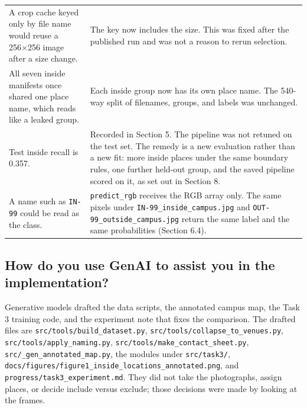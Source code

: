 \documentclass[11pt,a4paper]{article}
\providecommand{\real}[1]{#1}
\begin{document}
{\begin{longtable}[]{@{}
  >{\raggedright\arraybackslash}p{(\linewidth - 2\tabcolsep) * \real{0.5000}}
  >{\raggedright\arraybackslash}p{(\linewidth - 2\tabcolsep) * \real{0.5000}}@{}}
A crop cache keyed only by file name would reuse a 256×256 image after a size change. & The key now includes the size. This was fixed after the published run and was not a reason to rerun selection. \\
All seven inside manifests once shared one place name, which reads like a leaked group. & Each inside group now has its own place name. The 540-way split of filenames, groups, and labels was unchanged. \\
Test inside recall is 0.357. & Recorded in Section 5. The pipeline was not retuned on the test set. The remedy is a new evaluation rather than a new fit: more inside places under the same boundary rules, one further held-out group, and the saved pipeline scored on it, as set out in Section 8. \\
A name such as \texttt{IN-\allowbreak{}99} could be read as the class. & \texttt{predict\_\allowbreak{}rgb} receives the RGB array only. The same pixels under \texttt{IN-\allowbreak{}99\_\allowbreak{}inside\_\allowbreak{}campus.jpg} and \texttt{OUT-\allowbreak{}99\_\allowbreak{}outside\_\allowbreak{}campus.jpg} return the same label and the same probabilities (Section 6.4). \\
\end{longtable}
}

\subsection{How do you use GenAI to assist you in the implementation?}\label{how-do-you-use-genai-to-assist-you-in-the-implementation}

Generative models drafted the data scripts, the annotated campus map, the Task 3 training code, and the experiment note that fixes the comparison. The drafted files are \texttt{src/\allowbreak{}tools/\allowbreak{}build\_\allowbreak{}dataset.py}, \texttt{src/\allowbreak{}tools/\allowbreak{}collapse\_\allowbreak{}to\_\allowbreak{}venues.py}, \texttt{src/\allowbreak{}tools/\allowbreak{}apply\_\allowbreak{}naming.py}, \texttt{src/\allowbreak{}tools/\allowbreak{}make\_\allowbreak{}contact\_\allowbreak{}sheet.py}, \texttt{src/\allowbreak{}\_\allowbreak{}gen\_\allowbreak{}annotated\_\allowbreak{}map.py}, the modules under \texttt{src/\allowbreak{}task3/\allowbreak{}}, \texttt{docs/\allowbreak{}figures/\allowbreak{}figure1\_\allowbreak{}inside\_\allowbreak{}locations\_\allowbreak{}annotated.png}, and \texttt{progress/\allowbreak{}task3\_\allowbreak{}experiment.md}. They did not take the photographs, assign places, or decide include versus exclude; those decisions were made by looking at the frames.
\end{document}
